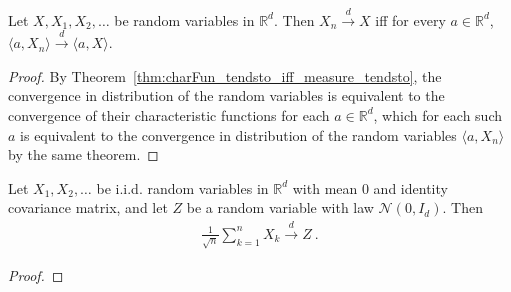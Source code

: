 \begin{theorem}\label{thm:cramer_wold}
Let $X, X_1, X_2, \ldots$ be random variables in $\mathbb{R}^d$.
Then $X_n \xrightarrow{d} X$ iff for every $a \in \mathbb{R}^d$, $\langle a, X_n \rangle \xrightarrow{d} \langle a, X \rangle$.
\end{theorem}

\begin{proof}
By Theorem~\ref{thm:charFun_tendsto_iff_measure_tendsto}, the convergence in distribution of the random variables is equivalent to the convergence of their characteristic functions for each $a \in \mathbb{R}^d$, which for each such $a$ is equivalent to the convergence in distribution of the random variables $\langle a, X_n \rangle$ by the same theorem.
\end{proof}

\begin{theorem}\label{thm:multivariate_clt}
Let $X_1, X_2, \ldots$ be i.i.d. random variables in $\mathbb{R}^d$ with mean 0 and identity covariance matrix, and let $Z$ be a random variable with law $\mathcal N(0,I_d)$. Then
\begin{align*}
\frac{1}{\sqrt{n}}\sum_{k=1}^n X_k \xrightarrow{d} Z \: .
\end{align*}
\end{theorem}

\begin{proof}

\end{proof}
